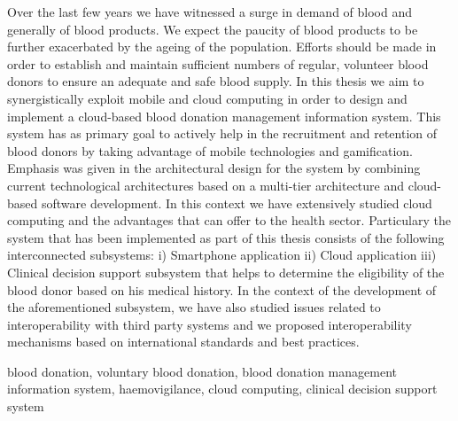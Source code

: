 \begin{abstracten}
	Over the last few years we have witnessed a surge in demand of blood and generally of blood products. We expect the paucity of blood products to be further exacerbated by the ageing of the population. Efforts should be made in order to establish and maintain sufficient numbers of regular, volunteer blood donors to ensure an adequate and safe blood supply. In this thesis we aim to synergistically exploit mobile and cloud computing in order to design and implement a cloud-based blood donation management information system. This system has as primary goal to actively help in the recruitment and retention of blood donors by taking advantage of mobile technologies and gamification. Emphasis was given in the architectural design for the system by combining current technological architectures based on a multi-tier architecture and cloud-based software development. In this context we have extensively studied cloud computing and the advantages that can offer to the health sector. Particulary the system that has been implemented as part of this thesis consists of the following interconnected subsystems: i) Smartphone application  ii) Cloud application iii) Clinical decision support subsystem that helps to determine the eligibility of the blood donor based on his medical history. In the context of the development of the aforementioned subsystem, we have also studied issues related to interoperability with third party systems and we proposed interoperability mechanisms based on international standards and best practices.
	\begin{keywordsen}
		blood donation, voluntary blood donation, blood donation management information system, haemovigilance, cloud computing, clinical decision support system
	\end{keywordsen}
\end{abstracten}

